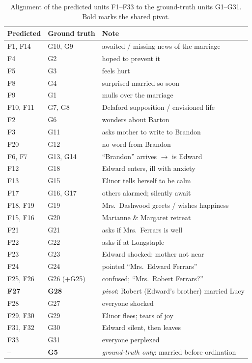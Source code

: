 \documentclass[11pt]{article}
\begin{document}
\begin{table}[h]
\centering\small
\begin{tabular}{lll}
\hline
\textbf{Predicted} & \textbf{Ground truth} & \textbf{Note}\\
\hline
F1, F14            & G10, G9        & awaited / missing news of the marriage\\
F4                 & G2             & hoped to prevent it\\
F5                 & G3             & feels hurt\\
F8                 & G4             & surprised married so soon\\
F9                 & G1             & mulls over the marriage\\
F10, F11           & G7, G8         & Delaford supposition / envisioned life\\
F2                 & G6             & wonders about Barton\\
F3                 & G11            & asks mother to write to Brandon\\
F20                & G12            & no word from Brandon\\
F6, F7             & G13, G14       & ``Brandon'' arrives $\to$ is Edward\\
F12               & G18            & Edward enters, ill with anxiety\\
F13                & G15            & Elinor tells herself to be calm\\
F17                & G16, G17       & others alarmed; silently await\\
F18, F19           & G19            & Mrs.~Dashwood greets / wishes happiness\\
F15, F16           & G20            & Marianne \& Margaret retreat\\
F21                & G21            & asks if Mrs.~Ferrars is well\\
F22                & G22            & asks if at Longstaple\\
F23                & G23            & Edward shocked: mother not near\\
F24                & G24            & pointed ``Mrs.~Edward Ferrars''\\
F25, F26           & G26 (+G25)     & confused; ``Mrs.~Robert Ferrars?''\\
\textbf{F27}       & \textbf{G28}   & \emph{pivot}: Robert (Edward's brother) married Lucy\\
F28                & G27            & everyone shocked\\
F29, F30           & G29            & Elinor flees; tears of joy\\
F31, F32           & G30            & Edward silent, then leaves\\
F33                & G31            & everyone perplexed\\
--                 & \textbf{G5}    & \emph{ground-truth only}: married before ordination\\
\hline
\end{tabular}
\caption{Alignment of the predicted units F1--F33 to the ground-truth units
G1--G31. Bold marks the shared pivot.}
\label{tab:gt-align}
\end{table}
\end{document}
